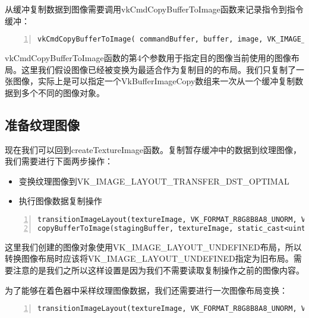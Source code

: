 \documentclass{ctexart}
\begin{document}
从缓冲复制数据到图像需要调用vkCmdCopyBufferToImage函数来记录指令到指令缓冲：

\begin{lstlisting}[language={[ANSI]C},keywordstyle=\color{blue!70},commentstyle=\color{red!50!green!50!blue!50},frame=shadowbox, rulesepcolor=\color{red!20!green!20!blue!20},basicstyle=\small,numbers=left, numberstyle=\tiny,breaklines=true]
vkCmdCopyBufferToImage( commandBuffer, buffer, image, VK_IMAGE_LAYOUT_TRANSFER_DST_OPTIMAL, 1, &region);
\end{lstlisting}

vkCmdCopyBufferToImage函数的第4个参数用于指定目的图像当前使用的图像布局。这里我们假设图像已经被变换为最适合作为复制目的的布局。我们只复制了一张图像，实际上是可以指定一个VkBufferImageCopy数组来一次从一个缓冲复制数据到多个不同的图像对象。

\subsection{准备纹理图像}

现在我们可以回到createTextureImage函数。复制暂存缓冲中的数据到纹理图像，我们需要进行下面两步操作：

\begin{itemize}
	\item 变换纹理图像到VK\_IMAGE\_LAYOUT\_TRANSFER\_DST\_OPTIMAL
	\item 执行图像数据复制操作
\end{itemize}

\begin{lstlisting}[language={[ANSI]C},keywordstyle=\color{blue!70},commentstyle=\color{red!50!green!50!blue!50},frame=shadowbox, rulesepcolor=\color{red!20!green!20!blue!20},basicstyle=\small,numbers=left, numberstyle=\tiny,breaklines=true]
transitionImageLayout(textureImage, VK_FORMAT_R8G8B8A8_UNORM, VK_IMAGE_LAYOUT_UNDEFINED, VK_IMAGE_LAYOUT_TRANSFER_DST_OPTIMAL);
copyBufferToImage(stagingBuffer, textureImage, static_cast<uint32_t>(texWidth), static_cast<uint32_t>(texHeight));
\end{lstlisting}

这里我们创建的图像对象使用VK\_IMAGE\_LAYOUT\_UNDEFINED布局，所以转换图像布局时应该将VK\_IMAGE\_LAYOUT\_UNDEFINED指定为旧布局。需要注意的是我们之所以这样设置是因为我们不需要读取复制操作之前的图像内容。

为了能够在着色器中采样纹理图像数据，我们还需要进行一次图像布局变换：

\begin{lstlisting}[language={[ANSI]C},keywordstyle=\color{blue!70},commentstyle=\color{red!50!green!50!blue!50},frame=shadowbox, rulesepcolor=\color{red!20!green!20!blue!20},basicstyle=\small,numbers=left, numberstyle=\tiny,breaklines=true]
transitionImageLayout(textureImage, VK_FORMAT_R8G8B8A8_UNORM, VK_IMAGE_LAYOUT_TRANSFER_DST_OPTIMAL, VK_IMAGE_LAYOUT_SHADER_READ_ONLY_OPTIMAL);
\end{lstlisting}
\end{document}
